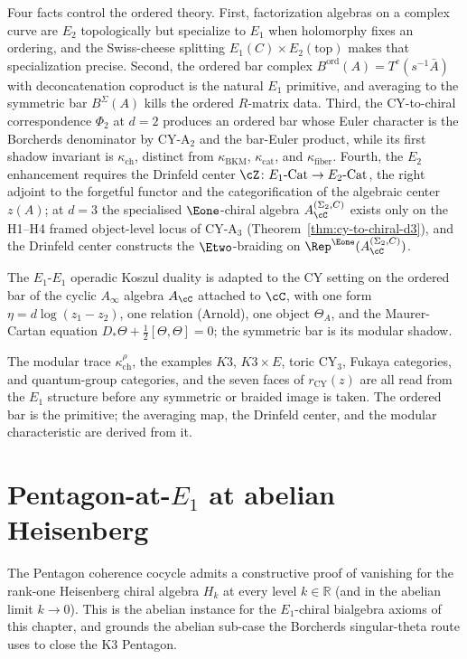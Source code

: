 Four facts control the ordered theory. First, factorization algebras on a complex curve are $E_2$ topologically but specialize to $E_1$ when holomorphy fixes an ordering, and the Swiss-cheese splitting $E_1(C) \times E_2(\mathrm{top})$ makes that specialization precise. Second, the ordered bar complex $B^{\mathrm{ord}}(A) = T^c(s^{-1}\bar A)$ with deconcatenation coproduct is the natural $E_1$ primitive, and averaging to the symmetric bar $B^{\Sigma}(A)$ kills the ordered $R$-matrix data. Third, the CY-to-chiral correspondence $\Phi_2$ at $d=2$ produces an ordered bar whose Euler character is the Borcherds denominator by CY-A$_2$ and the bar-Euler product, while its first shadow invariant is $\kappa_{\mathrm{ch}}$, distinct from $\kappa_{\mathrm{BKM}}$, $\kappa_{\mathrm{cat}}$, and $\kappa_{\mathrm{fiber}}$. Fourth, the $E_2$ enhancement requires the Drinfeld center $\cZ \colon E_1\text{-Cat} \to E_2\text{-Cat}$, the right adjoint to the forgetful functor and the categorification of the algebraic center $z(A)$; at $d=3$ the specialised $\Eone$-chiral algebra $A_\cC^{(\Sigma_2,C)}$ exists only on the H1--H4 framed object-level locus of CY-A$_3$ (Theorem~\ref{thm:cy-to-chiral-d3}), and the Drinfeld center constructs the $\Etwo$-braiding on $\Rep^{\Eone}(A_\cC^{(\Sigma_2,C)})$.

The $E_1$-$E_1$ operadic Koszul duality is adapted to the CY setting on the ordered bar of the cyclic $A_\infty$ algebra $A_\cC$ attached to $\cC$, with one form $\eta = d\log(z_1 - z_2)$, one relation (Arnold), one object $\Theta_A$, and the Maurer-Cartan equation $D_\ast \Theta + \tfrac{1}{2}[\Theta,\Theta] = 0$; the symmetric bar is its modular shadow.

The modular trace $\kappa_{\mathrm{ch}}^\rho$, the examples $K3$, $K3 \times E$, toric CY$_3$, Fukaya categories, and quantum-group categories, and the seven faces of $r_{\mathrm{CY}}(z)$ are all read from the $E_1$ structure before any symmetric or braided image is taken. The ordered bar is the primitive; the averaging map, the Drinfeld center, and the modular characteristic are derived from it.

\section{Pentagon-at-\texorpdfstring{$E_1$}{E-1} at abelian Heisenberg}
\label{sec:e1-pentagon-heisenberg}

The Pentagon coherence cocycle admits a constructive proof of
vanishing for the rank-one Heisenberg chiral algebra $H_k$ at every
level $k \in \mathbb{R}$ (and in the abelian limit $k \to 0$).
This is the abelian instance for the $E_1$-chiral bialgebra
axioms of this chapter, and grounds the abelian sub-case
the Borcherds singular-theta route uses to close the K$3$
Pentagon.

